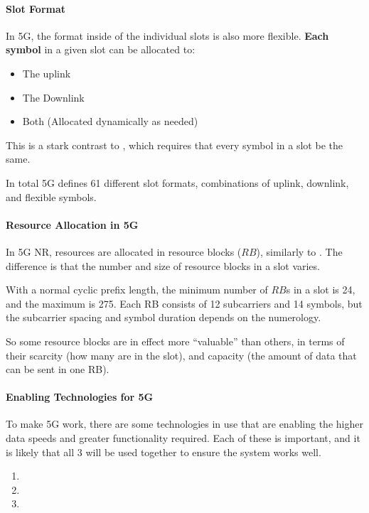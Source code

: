 \paragraph{Slot Format}\label{par:Slot_Format}
In 5G, the format inside of the individual slots is also more flexible.
\textbf{Each symbol} in a given slot can be allocated to:
\begin{itemize}[noitemsep]
\item The uplink
\item The Downlink
\item Both (Allocated dynamically as needed)
\end{itemize}

This is a stark contrast to , which requires that every symbol in a slot be the same.

In total 5G defines 61 different slot formats, combinations of uplink, downlink, and flexible symbols.

\paragraph{Resource Allocation in 5G}\label{par:5G_Resource_Allocation}
In 5G NR, resources are allocated in resource blocks ($RB$), similarly to .
The difference is that the number and size of resource blocks in a slot varies.

With a normal cyclic prefix length, the minimum number of $RB$s in a slot is 24, and the maximum is 275.
Each RB consists of 12 subcarriers and 14 symbols, but the subcarrier spacing and symbol duration depends on the numerology.

So some resource blocks are in effect more “valuable” than others, in terms of their scarcity (how many are in the slot), and capacity (the amount of data that can be sent in one RB).

\paragraph{Enabling Technologies for 5G}\label{par:5G_Enabling_Technologies}
To make 5G work, there are some technologies in use that are enabling the higher data speeds and greater functionality required.
Each of these is important, and it is likely that all 3 will be used together to ensure the system works well.
\begin{enumerate}[noitemsep]
\item {}
\item {}
\item {}
\end{enumerate}

